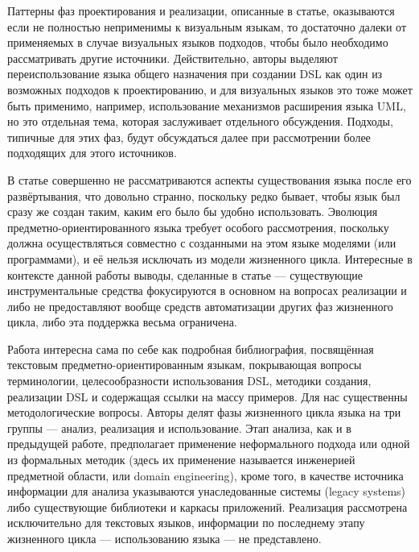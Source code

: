 Паттерны фаз проектирования и реализации, описанные в статье, оказываются если не полностью 
неприменимы к визуальным языкам, то достаточно далеки от применяемых в случае визуальных 
языков подходов, чтобы было необходимо рассматривать другие источники. Действительно, 
авторы выделяют переиспользование языка общего назначения при создании DSL как один 
из возможных подходов к проектированию, и для визуальных языков это тоже может быть 
применимо, например, использование механизмов расширения языка UML, но это отдельная 
тема, которая заслуживает отдельного обсуждения. Подходы, типичные для этих фаз, будут 
обсуждаться далее при рассмотрении более подходящих для этого источников.

В статье совершенно не рассматриваются аспекты существования языка после его развёртывания, 
что довольно странно, поскольку редко бывает, чтобы язык был сразу же создан таким, 
каким его было бы удобно использовать. Эволюция предметно-ориентированного языка требует 
особого рассмотрения, поскольку должна осуществляться совместно с созданными на этом языке 
моделями (или программами), и её нельзя исключать из модели жизненного цикла. Интересные 
в контексте данной работы выводы, сделанные в статье --- существующие инструментальные средства 
фокусируются в основном на вопросах реализации и либо не предоставляют вообще средств 
автоматизации других фаз жизненного цикла, либо эта поддержка весьма ограничена. 

Работа \cite{van2000domain} интересна сама по себе как подробная библиография, посвящённая 
текстовым предметно-ориентированным языкам, покрывающая вопросы терминологии, целесообразности 
использования DSL, методики создания, реализации DSL и содержащая ссылки на массу 
примеров. Для нас существенны методологические вопросы. Авторы делят фазы жизненного цикла языка 
на три группы --- анализ, реализация и использование. Этап анализа, как и в предыдущей работе, 
предполагает применение неформального подхода или одной из формальных методик (здесь их 
применение называется инженерией предметной области, или domain engineering), кроме 
того, в качестве источника информации для анализа указываются унаследованные системы 
(legacy systems) либо существующие библиотеки и каркасы приложений. Реализация 
рассмотрена исключительно для текстовых языков, информации по последнему этапу жизненного 
цикла --- использованию языка --- не представлено.

